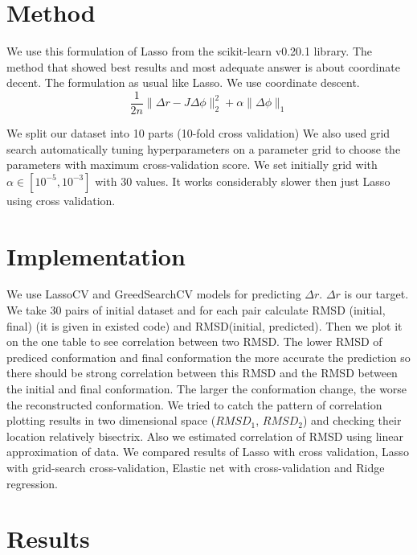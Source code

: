\documentclass[12pt,twoside]{article}
\begin{document}
 \section{Method}
 We use this formulation of Lasso from the  scikit-learn v0.20.1 library.
 The method that showed best results and most adequate answer is about coordinate decent. The formulation as usual like Lasso. We use coordinate descent. 
 $$\frac{1}{2n}\|\Delta r-J\Delta\phi\|_2^2+\alpha \|\Delta\phi\|_1$$

We split our dataset into 10 parts (10-fold cross validation)
We also used grid search automatically tuning hyperparameters on a parameter grid to choose the parameters with maximum  cross-validation score. We set initially grid with $\alpha\in[10^{-5}, 10^{-3}]$ with 30 values.   It works considerably slower then just Lasso using cross validation.



  
  \section{Implementation}
  
We use LassoCV and GreedSearchCV models for predicting $\Delta r$. $\Delta r$ is our target. 
 We take 30 pairs of initial dataset and for each pair calculate RMSD (initial, final) (it is given in existed code)  and RMSD(initial, predicted). Then we plot it on the one table to see correlation between two RMSD. The lower RMSD of prediced conformation and final conformation the more accurate the prediction so there should be strong correlation between this RMSD and the RMSD between the initial and final conformation. The larger the conformation change, the worse the reconstructed conformation. We tried to catch the pattern of correlation plotting results in two dimensional space ($RMSD_1$, $RMSD_2$) and checking their location relatively bisectrix. Also we estimated correlation of RMSD using linear approximation of data. We compared results of Lasso with cross validation, Lasso with grid-search cross-validation, Elastic net with cross-validation and Ridge regression.
 

\section{Results}
\end{document}
